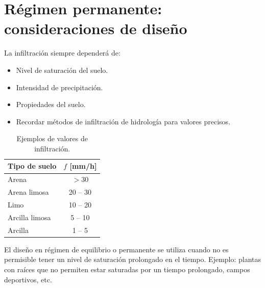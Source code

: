 \section{Régimen permanente: consideraciones de diseño}
La infiltración siempre dependerá de:
\begin{itemize}
  \item Nivel de saturación del suelo.
  \item Intensidad de precipitación.
  \item Propiedades del suelo.
  \item Recordar métodos de infiltración de hidrología para valores precisos.
\end{itemize}
\begin{table}[H]
\centering
\begin{tabular}{lc}
\toprule
\textbf{Tipo de suelo} & $f$ [mm/h]\\
\midrule
Arena & $>30$\\
Arena limosa & 20 -- 30\\
Limo & 10 -- 20\\
Arcilla limosa & 5 -- 10\\
Arcilla & 1 -- 5\\
\bottomrule
\end{tabular}
\caption{Ejemplos de valores de infiltración.}
\end{table}
El diseño en régimen de equilibrio o permanente se utiliza cuando no es
permisible tener un nivel de saturación prolongado en el tiempo. Ejemplo:
plantas con raíces que no permiten estar saturadas por un tiempo prolongado,
campos deportivos, etc.
